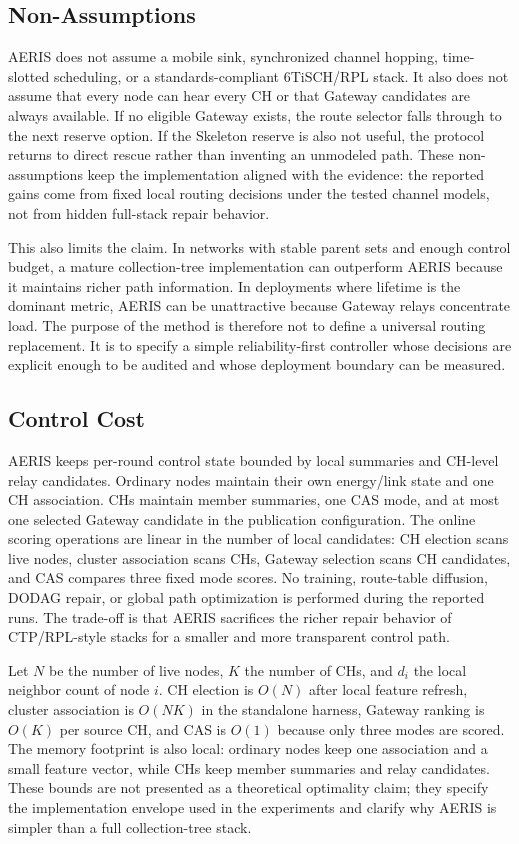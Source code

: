 \documentclass[conference]{IEEEtran}
\begin{document}
\subsection{Non-Assumptions}
AERIS does not assume a mobile sink, synchronized channel hopping, time-slotted scheduling, or a standards-compliant 6TiSCH/RPL stack. It also does not assume that every node can hear every CH or that Gateway candidates are always available. If no eligible Gateway exists, the route selector falls through to the next reserve option. If the Skeleton reserve is also not useful, the protocol returns to direct rescue rather than inventing an unmodeled path. These non-assumptions keep the implementation aligned with the evidence: the reported gains come from fixed local routing decisions under the tested channel models, not from hidden full-stack repair behavior.

This also limits the claim. In networks with stable parent sets and enough control budget, a mature collection-tree implementation can outperform AERIS because it maintains richer path information. In deployments where lifetime is the dominant metric, AERIS can be unattractive because Gateway relays concentrate load. The purpose of the method is therefore not to define a universal routing replacement. It is to specify a simple reliability-first controller whose decisions are explicit enough to be audited and whose deployment boundary can be measured.

\subsection{Control Cost}
AERIS keeps per-round control state bounded by local summaries and CH-level relay candidates. Ordinary nodes maintain their own energy/link state and one CH association. CHs maintain member summaries, one CAS mode, and at most one selected Gateway candidate in the publication configuration. The online scoring operations are linear in the number of local candidates: CH election scans live nodes, cluster association scans CHs, Gateway selection scans CH candidates, and CAS compares three fixed mode scores. No training, route-table diffusion, DODAG repair, or global path optimization is performed during the reported runs. The trade-off is that AERIS sacrifices the richer repair behavior of CTP/RPL-style stacks for a smaller and more transparent control path.

Let $N$ be the number of live nodes, $K$ the number of CHs, and $d_i$ the local neighbor count of node $i$. CH election is $O(N)$ after local feature refresh, cluster association is $O(NK)$ in the standalone harness, Gateway ranking is $O(K)$ per source CH, and CAS is $O(1)$ because only three modes are scored. The memory footprint is also local: ordinary nodes keep one association and a small feature vector, while CHs keep member summaries and relay candidates. These bounds are not presented as a theoretical optimality claim; they specify the implementation envelope used in the experiments and clarify why AERIS is simpler than a full collection-tree stack.
\end{document}
